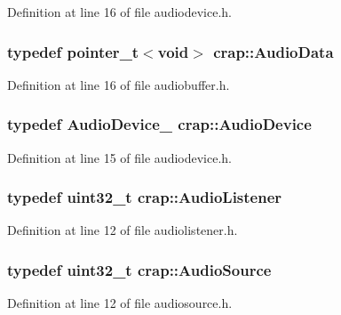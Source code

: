 Definition at line 16 of file audiodevice.\+h.

\hypertarget{namespacecrap_a0566c0c5049ce39b01856c01d2669f2c}{}
\subsubsection[{Audio\+Data}]{\setlength{\rightskip}{0pt plus 5cm}typedef {\bf pointer\+\_\+t}$<$void$>$ {\bf crap\+::\+Audio\+Data}}\label{namespacecrap_a0566c0c5049ce39b01856c01d2669f2c}


Definition at line 16 of file audiobuffer.\+h.

\hypertarget{namespacecrap_a0554191481198902f832204ecc2db4c0}{}
\subsubsection[{Audio\+Device}]{\setlength{\rightskip}{0pt plus 5cm}typedef {\bf Audio\+Device\+\_\+} {\bf crap\+::\+Audio\+Device}}\label{namespacecrap_a0554191481198902f832204ecc2db4c0}


Definition at line 15 of file audiodevice.\+h.

\hypertarget{namespacecrap_a73b9ecbfa0198e8a702c3569958e1653}{}
\subsubsection[{Audio\+Listener}]{\setlength{\rightskip}{0pt plus 5cm}typedef uint32\+\_\+t {\bf crap\+::\+Audio\+Listener}}\label{namespacecrap_a73b9ecbfa0198e8a702c3569958e1653}


Definition at line 12 of file audiolistener.\+h.

\hypertarget{namespacecrap_a462d678db37c6a434145136ab6d59720}{}
\subsubsection[{Audio\+Source}]{\setlength{\rightskip}{0pt plus 5cm}typedef uint32\+\_\+t {\bf crap\+::\+Audio\+Source}}\label{namespacecrap_a462d678db37c6a434145136ab6d59720}


Definition at line 12 of file audiosource.\+h.

